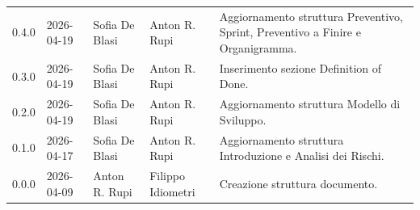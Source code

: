 \begin{longtable}{>{\ttfamily\small}l l l l >{\raggedright\arraybackslash}p{4cm}}
    0.4.0 & 2026-04-19 & {Sofia De Blasi} & {Anton R. Rupi} & Aggiornamento struttura Preventivo, Sprint, Preventivo a Finire e Organigramma. \\
    0.3.0 & 2026-04-19 & {Sofia De Blasi} & {Anton R. Rupi} & Inserimento sezione Definition of Done. \\
    0.2.0 & 2026-04-19 & {Sofia De Blasi} & {Anton R. Rupi} & Aggiornamento struttura Modello di Sviluppo. \\
    0.1.0 & 2026-04-17 & {Sofia De Blasi} & {Anton R. Rupi} & Aggiornamento struttura Introduzione e Analisi dei Rischi. \\
    0.0.0 & 2026-04-09 & {Anton R. Rupi} & {Filippo Idiometri} & Creazione struttura documento. \\
\end{longtable}